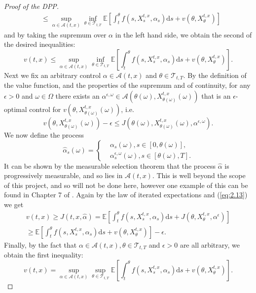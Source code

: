 \begin{proof}[Proof of the DPP]
\begin{align*}
        &\leq\sup_{\alpha\in\mathcal{A}(t,x)}\inf_{\theta\in\mathcal{T}_{t,T}}\mathbb{E}\left[\int_t^\theta f(s,X_s^{t,x},\alpha_s)\mathrm ds+v(\theta,X_\theta^{t,x})\right]
    \end{align*}
    and by taking the supremum over $\alpha$ in the left hand side, we obtain the second
    of the desired inequalities:
    \begin{equation}
        v(t,x)\leq\sup_{\alpha\in\mathcal{A}(t,x)}\inf_{\theta\in\mathcal{T}_{t,T}}\mathbb{E}\left[\int_t^\theta f(s,X_s^{t,x},\alpha_s)\mathrm ds+v(\theta,X_\theta^{t,x})\right].
    \end{equation}
    Next we fix an arbitrary control $\alpha\in\mathcal{A}(t,x)$ and $\theta\in\mathcal{T}_{t,T}.$
    By the definition of the value function, and the properties of the supremum and 
    of continuity, for any $\epsilon>0$ and $\omega\in\Omega$
    there exists an $\alpha^{\epsilon,\omega}\in\mathcal{A}(\theta(\omega),X_{\theta(\omega)}^{t,x}(\omega))$
    that is an $\epsilon$-optimal control for $v(\theta,X_{\theta(\omega)}^{t,x}(\omega))$, i.e.
    \begin{equation}\label{eq:2.13}
        v(\theta,X_{\theta(\omega)}^{t,x}(\omega))-\epsilon \leq J(\theta(\omega),X_{\theta(\omega)}^{t,x}(\omega),\alpha^{\epsilon,\omega}).
    \end{equation}
    We now define the process
    \begin{equation*}
        \hat{\alpha}_s(\omega)=\begin{cases}
            &\alpha_s(\omega), s\in[0,\theta(\omega)],\\
            &\alpha_s^{\epsilon,\omega}(\omega),s\in[\theta(\omega),T].
        \end{cases}
    \end{equation*}
    It can be shown by the measurable selection theorem that the process 
    $\hat{\alpha}$ is progressively measurable, and so lies in $\mathcal{A}(t,x)$.
    This is well beyond the scope of this project, and so will not be done here, 
    however one example of this can be found in Chapter 7 of \cite{BeSh78}.
    Again by the law of iterated expectations and (\ref{eq:2.13}) we get 
    \begin{align*}
        v(t,x)\geq J(t,x,\hat{\alpha})=\mathbb{E}\left[\int_t^\theta f(s,X_s^{t,x},\alpha_s)\mathrm ds+J(\theta,X_\theta^{t,x},\alpha^\epsilon)\right]\\
        \geq\mathbb{E}\left[\int_t^\theta f(s,X_s^{t,x},\alpha_s)\mathrm ds+v(\theta,X_\theta^{t,x})\right]-\epsilon.
    \end{align*}
    Finally, by the fact that $\alpha\in\mathcal{A}(t,x),\theta\in\mathcal{T}_{t,T}$
    and $\epsilon>0$ are all arbitrary, we obtain the first inequality:
    \begin{equation}
        v(t,x)=\sup_{\alpha\in\mathcal{A}(t,x)}\sup_{\theta\in\mathcal{T}_{t,T}}\mathbb{E}\left[\int_{t}^\theta f(s,X_s^{t,x},\alpha_s)\mathrm ds+v(\theta,X_\theta^{t,x})\right].
    \end{equation}
\end{proof}

